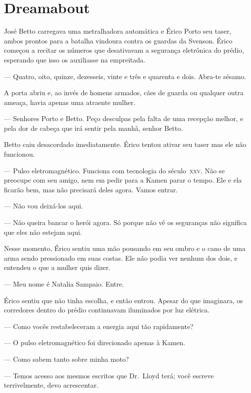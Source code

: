 \chapter{Dreamabout}


José Betto carregava uma metralhadora automática e Érico Porto seu taser, ambos
prontos para a batalha vindoura contra os guardas da Svenson. Érico começou a
recitar os números que desativavam a segurança eletrônica do prédio, esperando
que isso os auxiliasse na empreitada.

--- Quatro, oito, quinze, dezesseis, vinte e três e quarenta e dois. Abra-te
sésamo.

A porta abriu e, ao invés de homens armados, cães de guarda ou qualquer outra
ameaça, havia apenas uma atraente mulher.

--- Senhores Porto e Betto. Peço desculpas pela falta de uma recepção melhor, e
pela dor de cabeça que irá sentir pela manhã, senhor Betto.

Betto caiu desacordado imediatamente. Érico tentou ativar seu taser mas ele não
funcionou.

--- Pulso eletromagnético. Funciona com tecnologia do século~\textsc{xxv}. Não
se preocupe com seu amigo, nem em pedir para a Kamen parar o tempo. Ele e ela
ficarão bem, mas não precisará deles agora. Vamos entrar.

--- Não vou deixá-los aqui.

--- Não queira bancar o herói agora. Só porque não vê os seguranças não
significa que eles não estejam aqui.

Nesse momento, Érico sentiu uma mão pousando em seu ombro e o cano de uma arma
sendo pressionado em suas costas. Ele não podia ver nenhum dos dois, e entendeu
o que a mulher quis dizer.

--- Meu nome é Natalia Sampaio. Entre.

Érico sentiu que não tinha escolha, e então entrou. Apesar do que imaginara, os
corredores dentro do prédio continuavam iluminados por luz elétrica.

--- Como vocês restabeleceram a energia aqui tão rapidamente?

--- O pulso eletromagnético foi direcionado apenas à Kamen.

--- Como sabem tanto sobre minha moto?

--- Temos acesso aos mesmos escritos que Dr.~Lloyd terá; você escreve
terrivelmente, devo acrescentar.

